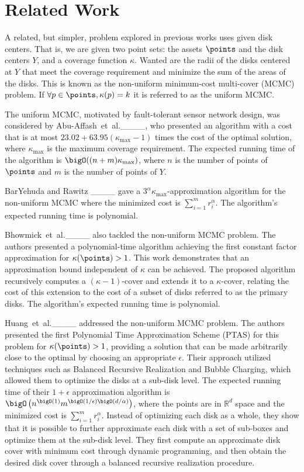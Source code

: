 \section{Related Work}
\label{sec:RelatedWork}

A related, but simpler, problem explored in previous works uses given disk centers.
That is, we are given two point sets: the assets $\points$ and the disk centers
$Y$, and a coverage function $\kappa$. Wanted are the radii of the disks
centered at $Y$ that meet the coverage requirement and minimize the sum of the
areas of the disks.  This is known as the non-uniform minimum-cost multi-cover
(MCMC) problem.
If $ \forall p \in \points, \kappa(p)=k $ it is referred to as the uniform MCMC.

The uniform MCMC, motivated by fault-tolerant sensor network design, was considered by Abu-Affash~et~al.____, who presented an algorithm with a cost that is at most $23.02 + 63.95(\kappa_{\text{max}} - 1)$ times the cost of the optimal solution, where
$\kappa_{\text{max}}$ is the maximum coverage requirement.
The expected running time of the algorithm is $\bigO((n + m)\kappa_{\text{max}})$, where $n$ is the number of points of $\points$ and $m$  is the number of points of $Y$.

BarYehuda and Rawitz ____ gave a $3^\alpha \kappa_{\text{max}}$-approximation algorithm for the non-uniform MCMC where the minimized cost is $\sum_{i=1}^{m} r_i^{\alpha}$.
The algorithm's expected running time   is polynomial.

Bhowmick~et~al.____ also tackled the non-uniform MCMC problem.
The authors presented a polynomial-time algorithm achieving the first constant factor approximation for $\kappa(\points)>1$.
This work demonstrates that an approximation bound independent of $\kappa$ can be achieved.
The proposed algorithm recursively computes a $(\kappa - 1)$-cover and extends it to a $\kappa$-cover, relating the cost of this extension to the cost of a subset of disks referred to as the primary disks.
The algorithm's expected running time is polynomial.

Huang~et~al.____ addressed the non-uniform MCMC problem.
The authors presented the first Polynomial Time Approximation Scheme (PTAS) for this problem for $\kappa(\points)>1$, providing a solution that can be made arbitrarily close to the optimal by choosing an appropriate $\epsilon$.
Their approach utilized techniques such as Balanced Recursive Realization and Bubble Charging, which allowed them to optimize the disks at a sub-disk level.
The expected running time of their $1+\epsilon$ approximation algorithm is $\bigO\left(n^{\bigO(1)} m^{\bigO(1/\epsilon) \bigO(d/\alpha)}\right)$, where the points are in $\mathbb{R}^d$ space and the minimized cost is $\sum_{i=1}^{m} r_i^{\alpha}$.
Instead of optimizing each disk as a whole, they show that it is possible to further approximate each disk with a set of sub-boxes and optimize them at the sub-disk level.
They first compute an approximate disk cover with minimum cost through dynamic programming, and then obtain the desired disk cover through a balanced recursive realization procedure.

